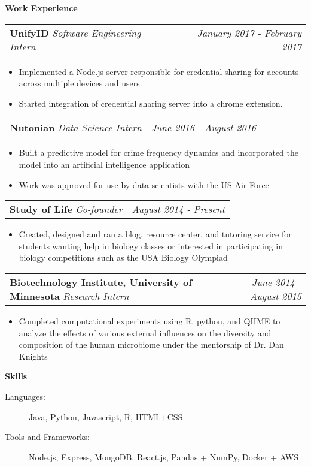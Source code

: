 \documentclass[letterpaper,10pt]{article}
\makeatletter
\newcommand{\resitem}[1]{\item #1 \vspace{-2pt}}
\newcommand{\resheading}[1]{{\large \colorbox{mygrey}{\begin{minipage}{\textwidth}{\textbf{#1 \vphantom{p\^{E}}}}\end{minipage}}}}
\newcommand{\ressubheading}[3]{
\begin{tabular*}{7.4in}{l@{\extracolsep{\fill}}r}
        \textbf{#1} \textit{#2} & \textit{#3} \\
\end{tabular*}\vspace{-6pt}}
\makeatother
\begin{document}
\resheading{Work Experience}
\begin{description}
\item
  \ressubheading{UnifyID}{Software Engineering Intern}{January 2017 - February 2017}
  \begin{itemize}[leftmargin=-1mm]
    \resitem{Implemented a Node.js server responsible for credential sharing for accounts across multiple devices and users.}
    \resitem{Started integration of credential sharing server into a chrome extension.}
  \end{itemize}
\item
  \ressubheading{Nutonian}{Data Science Intern}{June 2016 - August 2016}
  \begin{itemize}[leftmargin=-1mm]
    \resitem{Built a predictive model for crime frequency dynamics and incorporated the model into an artificial intelligence application}
    \resitem{Work was approved for use by data scientists with the US Air Force}
  \end{itemize}



\item
  \ressubheading{Study of Life}{Co-founder}{August 2014 - Present}
  \begin{itemize}[leftmargin=-1mm]
    \resitem{Created, designed and ran a blog, resource center, and tutoring service for students wanting help in biology classes or interested in participating in biology competitions such as the USA Biology Olympiad}

  \end{itemize}
  
\item
  \ressubheading{Biotechnology Institute, University of Minnesota}{Research Intern}{June 2014 - August 2015}
  \begin{itemize}[leftmargin=-1mm]
    \resitem{Completed computational experiments using R, python, and QIIME to analyze the effects of various external influences on the diversity and composition of the human microbiome under the mentorship of Dr. Dan Knights}

  \end{itemize}

\end{description}

\resheading{Skills}

\begin{description}
\item[Languages:]
Java, Python, Javascript, R, HTML+CSS
\item[Tools and Frameworks:]
Node.js, Express, MongoDB, React.js, Pandas + NumPy, Docker + AWS
\end{description}
\end{document}
